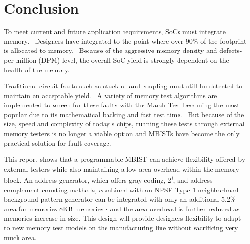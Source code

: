 \chapter{Conclusion}
\label{chap:conclusion}
To meet current and future application requirements, SoCs must integrate memory.  Designers have integrated to the point where over 90\% of the footprint is allocated to memory.  Because of the aggressive memory density and defects-per-million (DPM) level, the overall SoC yield is strongly dependent on the health of the memory.  

Traditional circuit faults such as stuck-at and coupling must still be detected to maintain an acceptable yield.  A variety of memory test algorithms are implemented to screen for these faults with the March Test becoming the most popular due to its mathematical backing and fast test time.  But because of the size, speed and complexity of today’s chips, running these tests through external memory testers is no longer a viable option and MBISTs have become the only practical solution for fault coverage.  

This report shows that a programmable MBIST can achieve flexibility offered by external testers while also maintaining a low area overhead within the memory block.  An address generator, which offers gray coding, 2\textsuperscript{\textit{i}}, and address complement counting methods, combined with an NPSF Type-1 neighborhood background pattern generator can be integrated with only an additional 5.2\% area for memories 8KB memories - and the area overhead is further reduced as memories increase in size.  This design will provide designers flexibility to adapt to new memory test models on the manufacturing line without sacrificing very much area.  


